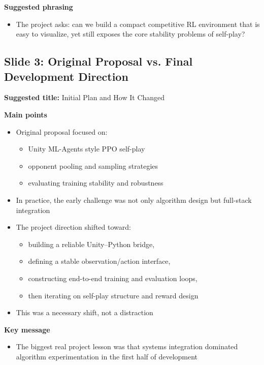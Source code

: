 \documentclass[11pt]{article}
\begin{document}
\textbf{Suggested phrasing}
\begin{itemize}
    \item The project asks: can we build a compact competitive RL environment that is easy to visualize, yet still exposes the core stability problems of self-play?
\end{itemize}

\subsection*{Slide 3: Original Proposal vs. Final Development Direction}

\textbf{Suggested title:} Initial Plan and How It Changed

\textbf{Main points}
\begin{itemize}
    \item Original proposal focused on:
    \begin{itemize}
        \item Unity ML-Agents style PPO self-play
        \item opponent pooling and sampling strategies
        \item evaluating training stability and robustness
    \end{itemize}
    \item In practice, the early challenge was not only algorithm design but full-stack integration
    \item The project direction shifted toward:
    \begin{itemize}
        \item building a reliable Unity--Python bridge,
        \item defining a stable observation/action interface,
        \item constructing end-to-end training and evaluation loops,
        \item then iterating on self-play structure and reward design
    \end{itemize}
    \item This was a necessary shift, not a distraction
\end{itemize}

\textbf{Key message}
\begin{itemize}
    \item The biggest real project lesson was that systems integration dominated algorithm experimentation in the first half of development
\end{itemize}
\end{document}
